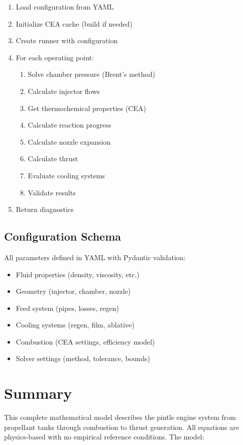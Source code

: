 \documentclass[12pt,a4paper]{article}
\begin{document}
\begin{enumerate}
    \item Load configuration from YAML
    \item Initialize CEA cache (build if needed)
    \item Create runner with configuration
    \item For each operating point:
    \begin{enumerate}
        \item Solve chamber pressure (Brent's method)
        \item Calculate injector flows
        \item Get thermochemical properties (CEA)
        \item Calculate reaction progress
        \item Calculate nozzle expansion
        \item Calculate thrust
        \item Evaluate cooling systems
        \item Validate results
    \end{enumerate}
    \item Return diagnostics
\end{enumerate}

\subsection{Configuration Schema}

All parameters defined in YAML with Pydantic validation:
\begin{itemize}
    \item Fluid properties (density, viscosity, etc.)
    \item Geometry (injector, chamber, nozzle)
    \item Feed system (pipes, losses, regen)
    \item Cooling systems (regen, film, ablative)
    \item Combustion (CEA settings, efficiency model)
    \item Solver settings (method, tolerance, bounds)
\end{itemize}

\section{Summary}

This complete mathematical model describes the pintle engine system from propellant tanks through combustion to thrust generation. All equations are physics-based with no empirical reference conditions. The model:
\end{document}
